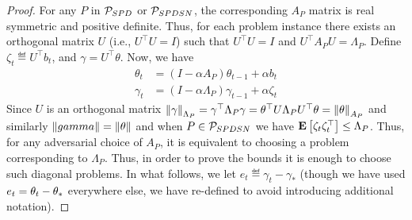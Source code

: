\thpspd*
\begin{proof}
For any $P$ in $\P_{SPD}$ or $\P_{SPDSN}$, the corresponding $A_P$ matrix is real symmetric and positive definite. Thus, for each problem instance there exists an orthogonal matrix $U$ (i.e., $U^\top U=I$) such that $U^\top U=I$ and $U^\top A_P U=\Lambda_P$. Define $\zeta_t\eqdef U^\top b_t$, and $\gamma=U^\top \theta$. Now, we have
\begin{align}
\theta_t&=(I-\alpha A_P)\theta_{t-1}+\alpha b_t\\
\label{eq:gamrec}\gamma_t&=(I-\alpha \Lambda_P)\gamma_{t-1}+\alpha \zeta_t
\end{align}
Since $U$ is an orthogonal matrix $\norm{\gamma}_{\Lambda_P}=\gamma^\top \Lambda_P \gamma= \theta^\top U \Lambda_P U^\top \theta=\norm{\theta}_{A_P}$ and similarly $\norm{gamma}=\norm{\theta}$ and when $P\in \P_{SPDSN}$ we have $\EE{\zeta_t \zeta_t^\top}\leq \Lambda_P$. Thus, for any adversarial choice of $A_P$, it is equivalent to choosing a problem corresponding to $\Lambda_P$. Thus, in order to prove the bounds it is enough to choose such diagonal problems. In what follows, we let $e_t\eqdef\gamma_t-\gamma_*$ (though we have used $e_t=\theta_t-\ts$ everywhere else, we have re-defined to avoid introducing additional notation).


\end{proof}
